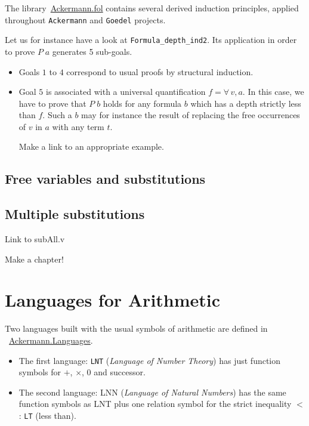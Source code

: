The library~\href{../theories/html/hydras.Ackermann.fol.html}{Ackermann.fol} contains several derived induction principles, applied 
throughout \texttt{Ackermann} and \texttt{Goedel} projects.


Let us for instance have a look  at \texttt{Formula\_depth\_ind2}. Its application in order to prove $P\;a$ generates 5 sub-goals. 


\begin{itemize}
\item Goals $1$ to $4$ correspond to  usual proofs by structural induction.
\item Goal $5$ is associated with a universal quantification $f=\forall\,v,a$. In this case, we have to prove that $P\;b$ holds for any formula $b$ which has a depth strictly less than $f$. Such a $b$ may for instance the result of replacing the free occurrences of $v$ in $a$ with any term $t$.
  \begin{todo}
   Make a link to an appropriate example.
  \end{todo}
\end{itemize}



\subsection{Free variables and substitutions}



\subsection{Multiple substitutions}

\begin{todo}
Link to subAll.v
\end{todo}

\begin{todo}
Make a chapter!
\end{todo}
\section{Languages for Arithmetic}



Two languages built with the usual symbols of arithmetic are 
defined in ~\href{../theories/html/hydras.Ackermann.Languages.html}{Ackermann.Languages}.

\begin{itemize}
\item The first language: \texttt{LNT} (\emph{Language of Number Theory}) has just function symbols for $+$, $\times$, $0$ and successor.
\item The second language: LNN (\emph{Language of Natural Numbers})  has
the same function symbols as LNT plus one relation symbol for the strict inequality $<$ : \texttt{LT} (less than).
\end{itemize}

